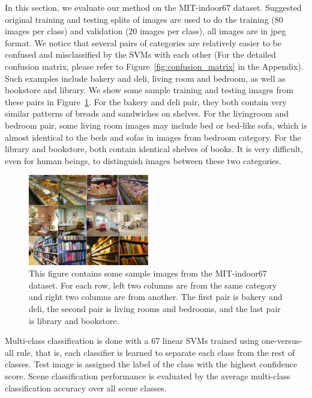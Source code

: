 
In this section, we evaluate our method on the MIT-indoor67 dataset. Suggested
original training and testing splits of images are used to do the training
(80 images per class) and validation (20 images per class), all images are in 
jpeg format. We notice that several pairs of categories are relatively easier
to be confused and misclassified by the SVMs with each other (For the detailed
confusion matrix, please refer to Figure~\ref{fig:confusion_matrix}
in the Appendix). Such examples include bakery and deli, living room and bedroom,
as well as bookstore and library. We show some sample training and testing images
from these pairs in Figure~\ref{fig:sample}. For the bakery and deli pair, they
both contain very similar patterns of breads and sandwiches on shelves. For the
livingroom and bedroom pair, some living room images may include bed or bed-like
sofa, which is almost identical to the beds and sofas in images from bedroom
category. For the library and bookstore, both contain identical shelves of books.
It is very difficult, even for human beings, to distinguish images between these
two categories.

\begin{figure}[ht]
  \centering
  \includegraphics[width=0.47\textwidth]{img/dataset.pdf}
  \centering
  \caption{This figure contains some sample images from the MIT-indoor67 dataset.
For each row, left two columns are from the same category and right two columns
are from another. The first pair is bakery and deli, the second pair is living
rooms and bedrooms, and the last pair is library and bookstore.}
\label{fig:sample}
\end{figure}

Multi-class classification is done with a 67 linear SVMs trained using
one-versus-all rule, that is, each classifier is learned to separate each class
from the rest of classes. Test image is assigned the label of the class with the
highest confidence score. Scene classification performance is evaluated by the
average multi-class classification accuracy over all scene classes.

